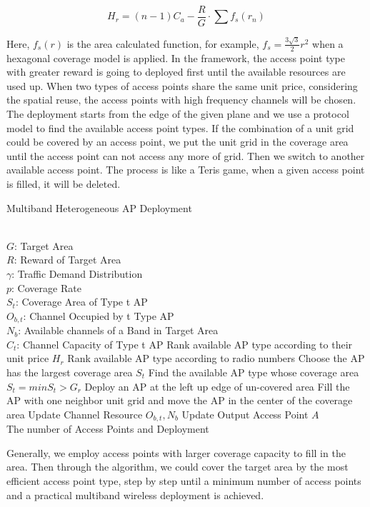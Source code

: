\begin{equation}
\label{eq:unitprice}
H_r=(n-1) C_a - \frac{R}{G}\cdot\sum f_s(r_n)
\end{equation}

Here, $f_s(r)$ is the area calculated function, for example, $f_s = \frac{3\sqrt{3}}{2}r^2$ when a 
hexagonal coverage model is applied. In the framework, the access point type with greater reward 
is going to deployed first until the available resources are used up. When two types of access points
share the same unit price, considering the spatial reuse, the access points with high frequency channels
will be chosen. The deployment starts from the edge of the given plane and we use a protocol model
to find the available access point types. If the combination of a unit 
grid could be covered by an access point, we put the unit grid in the coverage area until the access
point can not access any more of grid. Then we switch to another available access point. The process is like
a Teris game, when a given access point is filled, it will be deleted.
\begin{algorithm}
\caption{Multiband Heterogeneous AP Deployment}
\label{alg:gls}
\begin{algorithmic}[1]
\REQUIRE  ~~\\
$G$: Target Area \\
$R$: Reward of Target Area \\
$\gamma$: Traffic Demand Distribution\\
$p$: Coverage Rate\\
$S_t$: Coverage Area of Type t AP \\
$O_{b,t}$: Channel Occupied by t Type AP\\
$N_b$: Available channels of a Band in Target Area\\
$C_t$: Channel Capacity of Type t AP
\STATE Rank available AP type according to their unit price $H_r$
\STATE Rank available AP type according to radio numbers
\STATE Choose the AP has the largest coverage area $S_t$
\ELSE 
\STATE Find the available AP type whose coverage area $S_t=min{S_t>G_r}$
\ENDIF
\STATE Deploy an AP at the left up edge of un-covered area
\STATE Fill the AP with one neighbor unit grid and move the AP in the center of the coverage area
\STATE Update Channel Resource $O_{b,t}, N_b$
\STATE Update Output Access Point $A$
\ENDWHILE
\ENSURE ~~\\
The number of Access Points and Deployment\\
\end{algorithmic}
\end{algorithm}

Generally, we employ access points with larger coverage capacity to fill in the area. Then 
through the algorithm, we could cover the target area by the most efficient access point type,
step by step until a  minimum number of access points and a practical multiband wireless 
deployment is achieved.
